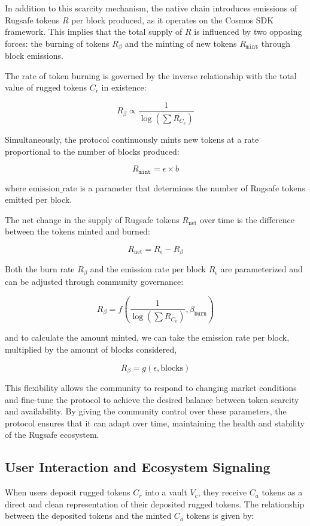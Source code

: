 \documentclass{article}
\begin{document}
In addition to this scarcity mechanism, the native chain introduces emissions of Rugsafe tokens $R$ per block produced, as it operates on the Cosmos SDK framework. This implies that the total supply of $R$ is influenced by two opposing forces: the burning of tokens $R_\beta$ and the minting of new tokens $R_\texttt{mint}$ through block emissions.

The rate of token burning is governed by the inverse relationship with the total value of rugged tokens $C_r$ in existence:

\[
R_{\beta} \propto \frac{1}{\log\left(\sum R_{C_v}\right)}
\]

Simultaneously, the protocol continuously mints new tokens at a rate proportional to the number of blocks produced:

\[
R_{\texttt{mint}} = \epsilon \times b
\]

where $\text{emission\_rate}$ is a parameter that determines the number of Rugsafe tokens emitted per block.

The net change in the supply of Rugsafe tokens $R_\text{net}$ over time is the difference between the tokens minted and burned:

\[
R_{\text{net}} = R_{\epsilon} - R_{\beta}
\]

Both the burn rate $R_{\beta}$ and the emission rate per block $R_\epsilon$ are parameterized and can be adjusted through community governance:

\[
R_\beta = f\left(\frac{1}{\log\left(\sum R_{C_v}\right)}, \beta_{\texttt{burn}}\right)
\]


and to calculate the amount minted, we can take the emission rate per block, multiplied by the amount of blocks considered,

\[
R_{\beta} = g(\epsilon, \text{blocks})
\]

This flexibility allows the community to respond to changing market conditions and fine-tune the protocol to achieve the desired balance between token scarcity and availability. By giving the community control over these parameters, the protocol ensures that it can adapt over time, maintaining the health and stability of the Rugsafe ecosystem.










\subsection{User Interaction and Ecosystem Signaling}
When users deposit rugged tokens $C_r$ into a vault $V_c$, they receive $C_a$ tokens as a direct and clean representation of their deposited rugged tokens. The relationship between the deposited tokens and the minted $C_a$ tokens is given by:
\end{document}
